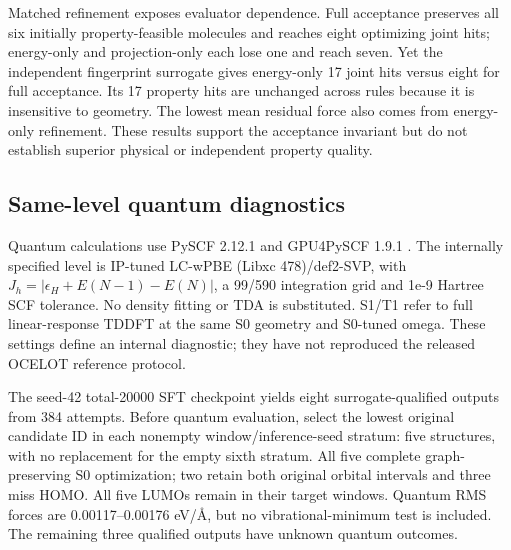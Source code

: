 \documentclass[11pt,a4paper]{article}
\begin{document}
Matched refinement exposes evaluator dependence. Full acceptance
preserves all six initially property-feasible molecules and reaches
eight optimizing joint hits; energy-only and projection-only each lose
one and reach seven. Yet the independent fingerprint surrogate gives
energy-only 17 joint hits versus eight for full acceptance. Its 17
property hits are unchanged across rules because it is insensitive to
geometry. The lowest mean residual force also comes from energy-only
refinement. These results support the acceptance invariant but do not
establish superior physical or independent property quality.

\FloatBarrier
\subsection{Same-level quantum
diagnostics}\label{same-level-quantum-diagnostics}

Quantum calculations use PySCF 2.12.1 \citep{sun2020pyscf} and GPU4PySCF
1.9.1 \citep{li2024gpu4pyscf}. The internally specified level is
IP-tuned LC-wPBE (Libxc 478)/def2-SVP, with
\(J_h=|\epsilon_H+E(N-1)-E(N)|\), a 99/590 integration grid and 1e-9
Hartree SCF tolerance. No density fitting or TDA is substituted. S1/T1
refer to full linear-response TDDFT at the same S0 geometry and S0-tuned
omega. These settings define an internal diagnostic; they have not
reproduced the released OCELOT reference protocol.

The seed-42 total-20000 SFT checkpoint yields eight surrogate-qualified
outputs from 384 attempts. Before quantum evaluation, select the lowest
original candidate ID in each nonempty window/inference-seed stratum:
five structures, with no replacement for the empty sixth stratum. All
five complete graph-preserving S0 optimization; two retain both original
orbital intervals and three miss HOMO. All five LUMOs remain in their
target windows. Quantum RMS forces are 0.00117--0.00176 eV/Å, but no
vibrational-minimum test is included. The remaining three qualified
outputs have unknown quantum outcomes.
\end{document}
